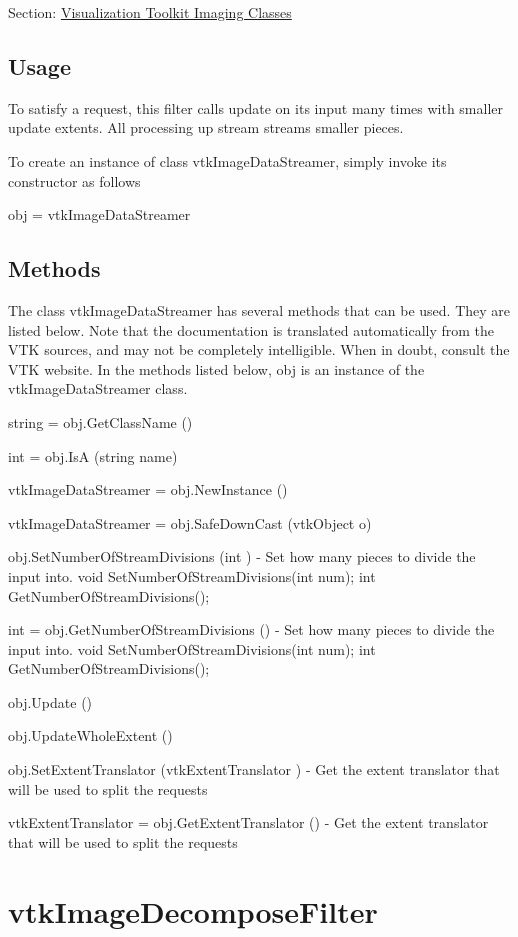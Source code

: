Section\-: \hyperlink{sec_vtkimaging}{Visualization Toolkit Imaging Classes} \hypertarget{vtkwidgets_vtkxyplotwidget_Usage}{}\subsection{Usage}\label{vtkwidgets_vtkxyplotwidget_Usage}
To satisfy a request, this filter calls update on its input many times with smaller update extents. All processing up stream streams smaller pieces.

To create an instance of class vtk\-Image\-Data\-Streamer, simply invoke its constructor as follows \begin{DoxyVerb}  obj = vtkImageDataStreamer
\end{DoxyVerb}
 \hypertarget{vtkwidgets_vtkxyplotwidget_Methods}{}\subsection{Methods}\label{vtkwidgets_vtkxyplotwidget_Methods}
The class vtk\-Image\-Data\-Streamer has several methods that can be used. They are listed below. Note that the documentation is translated automatically from the V\-T\-K sources, and may not be completely intelligible. When in doubt, consult the V\-T\-K website. In the methods listed below, {\ttfamily obj} is an instance of the vtk\-Image\-Data\-Streamer class. 
\begin{DoxyItemize}
\item {\ttfamily string = obj.\-Get\-Class\-Name ()}  
\item {\ttfamily int = obj.\-Is\-A (string name)}  
\item {\ttfamily vtk\-Image\-Data\-Streamer = obj.\-New\-Instance ()}  
\item {\ttfamily vtk\-Image\-Data\-Streamer = obj.\-Safe\-Down\-Cast (vtk\-Object o)}  
\item {\ttfamily obj.\-Set\-Number\-Of\-Stream\-Divisions (int )} -\/ Set how many pieces to divide the input into. void Set\-Number\-Of\-Stream\-Divisions(int num); int Get\-Number\-Of\-Stream\-Divisions();  
\item {\ttfamily int = obj.\-Get\-Number\-Of\-Stream\-Divisions ()} -\/ Set how many pieces to divide the input into. void Set\-Number\-Of\-Stream\-Divisions(int num); int Get\-Number\-Of\-Stream\-Divisions();  
\item {\ttfamily obj.\-Update ()}  
\item {\ttfamily obj.\-Update\-Whole\-Extent ()}  
\item {\ttfamily obj.\-Set\-Extent\-Translator (vtk\-Extent\-Translator )} -\/ Get the extent translator that will be used to split the requests  
\item {\ttfamily vtk\-Extent\-Translator = obj.\-Get\-Extent\-Translator ()} -\/ Get the extent translator that will be used to split the requests  
\end{DoxyItemize}\hypertarget{vtkimaging_vtkimagedecomposefilter}{}\section{vtk\-Image\-Decompose\-Filter}\label{vtkimaging_vtkimagedecomposefilter}
